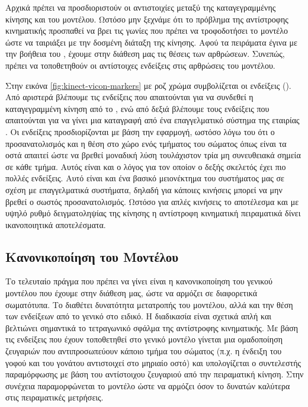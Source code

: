 Αρχικά πρέπει να προσδιοριστούν οι αντιστοιχίες μεταξύ της καταγεγραμμένης κίνησης και του μοντέλου. Ωστόσο μην ξεχνάμε ότι το πρόβλημα της αντίστροφης κινηματικής προσπαθεί να βρει τις γωνίες που πρέπει να τροφοδοτήσει το μοντέλο ώστε να ταιριάξει με την δοσμένη διάταξη της κίνησης. Αφού τα πειράματα έγινα με την βοήθεια του , έχουμε στην διάθεση μας τις θέσεις των αρθρώσεων. Συνεπώς, πρέπει να τοποθετηθούν οι αντίστοιχες ενδείξεις στις αρθρώσεις του μοντέλου.

Στην εικόνα \ref{fig:kinect-vicon-markers} με ροζ χρώμα συμβολίζεται οι ενδείξεις (). Από αριστερά βλέπουμε τις ενδείξεις που απαιτούνται για να συνδεθεί η καταγεγραμμένη κίνηση από το , ενώ από δεξιά βλέπουμε τους ενδείξεις που απαιτούνται για να γίνει μια καταγραφή από ένα επαγγελματικό σύστημα της εταιρίας . Οι ενδείξεις προσδιορίζονται με βάση την εφαρμογή, ωστόσο λόγω του ότι ο προσανατολισμός και η θέση στο χώρο ενός τμήματος του σώματος όπως είναι τα οστά απαιτεί ώστε να βρεθεί μοναδική λύση τουλάχιστον τρία μη συνευθειακά σημεία σε κάθε τμήμα. Αυτός είναι και ο λόγος για τον οποίον ο δεξής σκελετός έχει πιο πολλές ενδείξεις. Αυτό είναι και ένα βασικό μειονέκτημα του συστήματος μας σε σχέση με επαγγελματικά συστήματα, δηλαδή για κάποιες κινήσεις μπορεί να μην βρεθεί ο σωστός προσανατολισμός. Ωστόσο για απλές κινήσεις το αποτέλεσμα και με υψηλό ρυθμό δειγματοληψίας της κίνησης η αντίστροφη κινηματική πειραματικά δίνει ικανοποιητικά αποτελέσματα.

\subsection{Κανονικοποίηση του Μοντέλου}

Το τελευταίο πράγμα που πρέπει να γίνει είναι η κανονικοποίηση του γενικού μοντέλου που έχουμε στην διάθεση μας, ώστε να αρμόζει σε διαφορετικά σωματότυπα. Το  διαθέτει δυνατότητα μετατροπής του μοντέλου, αλλά και την θέση των ενδείξεων από το γενικό στο ειδικό. Η διαδικασία είναι σχετικά απλή και βελτιώνει σημαντικά το τετραγωνικό σφάλμα της αντίστροφης κινηματικής. Με βάση τις ενδείξεις που έχουν τοποθετηθεί στο γενικό μοντέλο γίνεται μια ομαδοποίηση ζευγαριών που αντιπροσωπεύουν κάποιο τμήμα του σώματος (π.χ. η ένδειξη του γοφού και του γονάτου αντιστοιχεί στο μηριαίο οστό) και υπολογίζεται ο συντελεστής παραμόρφωσης με βάση του αντίστοιχου ζευγαριού από την πειραματική κίνηση. Στην συνέχεια παραμορφώνεται το μοντέλο ώστε να αρμόζει όσον το δυνατών καλύτερα στις πειραματικές μετρήσεις.

